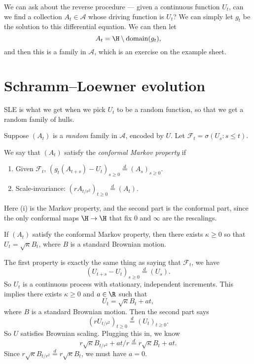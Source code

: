\documentclass[a4paper]{article}
\begin{document}
We can ask about the reverse procedure --- given a continuous function $U_t$, can we find a collection $A_t \in \mathcal{A}$ whose driving function is $U_t$? We can simply let $g_t$ be the solution to this differential equation. We can then let
\[
  A_t = \H \setminus \mathrm{domain}(g_t),
\]
and then this is a family in $\mathcal{A}$, which is an exercise on the example sheet.

\section{Schramm--Loewner evolution}
SLE is what we get when we pick $U_t$ to be a random function, so that we get a random family of hulls.

Suppose $(A_t)$ is a \emph{random} family in $\mathcal{A}$, encoded by $U$. Let $\mathcal{F}_t = \sigma(U_s: s \leq t)$.
\begin{defi}
  We say that $(A_t)$ satisfy the \emph{conformal Markov property} if
  \begin{enumerate}
    \item Given $\mathcal{F}_t$, $(g_t(A_{t + s}) - U_t)_{s \geq 0} \overset{d}{=} (A_s)_{s \geq 0}$.
    \item Scale-invariance: $(r A_{t/r^2} )_{t \geq 0} \overset{d}{=} (A_t)$.
  \end{enumerate}
\end{defi}
Here (i) is the Markov property, and the second part is the conformal part, since the only conformal maps $\H \to \H$ that fix $0$ and $\infty$ are the rescalings.

\begin{thm}[Schramm]
  If $(A_t)$ satisfy the conformal Markov property, then there exists $\kappa \geq 0$ so that $U_t = \sqrt{\kappa} B_t$, where $B$ is a standard Brownian motion.
\end{thm}

\begin{prop}
  The first property is exactly the same thing as saying that $\mathcal{F}_t$, we have
  \[
    (U_{t + s} - U_t)_{s \geq 0} \overset{d}{=} (U_s).
  \]
  So $U_t$ is a continuous process with stationary, independent increments. This implies there exists $\kappa \geq 0$ and $a \in \R$ such that
  \[
    U_t = \sqrt{\kappa}B_t + at,
  \]
  where $B$ is a standard Brownian motion. Then the second part says
  \[
    (r U_{t/r^2})_{t \geq 0} \overset{d}{=} (U_t)_{t \geq 0}.
  \]
  So $U$ satisfies Brownian scaling. Plugging this in, we know
  \[
    r \sqrt{\kappa} B_{t/r^2} + at/r \overset{d}{=} r \sqrt{\kappa} B_t + at.
  \]
  Since $r \sqrt{\kappa} B_{t/r^2} \overset{d}{=} r \sqrt{\kappa} B_t$, we must have $a = 0$.
\end{prop}
\end{document}
